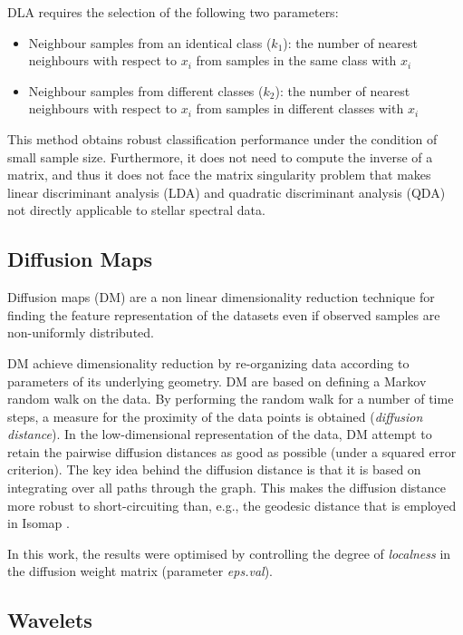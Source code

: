 \documentclass[a4paper,fleqn,usenatbib]{mnras}
\begin{document}
DLA requires the selection of the following two parameters:
\begin{itemize}
\item Neighbour samples from an identical class ($k_1$): 
	the number of nearest neighbours with respect to $x_i$
	from samples in the same class with $x_i$
\item Neighbour samples from different classes ($k_2$): 
	the number of nearest neighbours with respect to $x_i$
	from samples in different classes with $x_i$
\end{itemize}

This method obtains robust classification performance under the
condition of small sample size. Furthermore, it does not need to
compute the inverse of a matrix, and thus it does not face the matrix
singularity problem that makes linear discriminant analysis (LDA) and
quadratic discriminant analysis (QDA) not directly applicable to
stellar spectral data.

\subsection{Diffusion Maps}

Diffusion maps (DM) \citep{coifman:06,nadler:06} are a non linear
dimensionality reduction technique for finding the feature
representation of the datasets even if observed samples are
non-uniformly distributed.

DM achieve dimensionality reduction by re-organizing data according to
parameters of its underlying geometry. DM are based on defining a
Markov random walk on the data. By performing the random walk for a
number of time steps, a measure for the proximity of the data points
is obtained (\textit{diffusion distance}). In the low-dimensional
representation of the data, DM attempt to retain the pairwise
diffusion distances as good as possible (under a squared error
criterion). The key idea behind the diffusion distance is that it is
based on integrating over all paths through the graph. This makes the
diffusion distance more robust to short-circuiting than, e.g., the
geodesic distance that is employed in Isomap \citep{tenenbaum:00}.

In this work, the results were optimised by controlling the degree 
of {\sl localness} in the diffusion weight matrix (parameter \textit{eps.val}).

\subsection{Wavelets}
\end{document}
